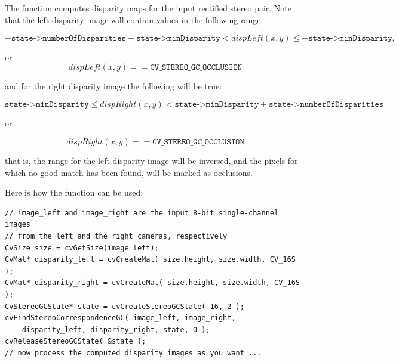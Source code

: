\begin{description}
\end{description}

The function computes disparity maps for the input rectified stereo pair. Note that the left disparity image will contain values in the following range: 

\[
-\texttt{state->numberOfDisparities}-\texttt{state->minDisparity}
< dispLeft(x,y) \le -\texttt{state->minDisparity},
\]

or
\[
dispLeft(x,y) == \texttt{CV\_STEREO\_GC\_OCCLUSION}
\]

and for the right disparity image the following will be true: 

\[
\texttt{state->minDisparity} \le dispRight(x,y) 
< \texttt{state->minDisparity} + \texttt{state->numberOfDisparities}
\]

or

\[
dispRight(x,y) == \texttt{CV\_STEREO\_GC\_OCCLUSION}
\]

that is, the range for the left disparity image will be inversed,
and the pixels for which no good match has been found, will be marked
as occlusions.

Here is how the function can be used:

\ifC
\begin{lstlisting}
// image_left and image_right are the input 8-bit single-channel images
// from the left and the right cameras, respectively
CvSize size = cvGetSize(image_left);
CvMat* disparity_left = cvCreateMat( size.height, size.width, CV_16S );
CvMat* disparity_right = cvCreateMat( size.height, size.width, CV_16S );
CvStereoGCState* state = cvCreateStereoGCState( 16, 2 );
cvFindStereoCorrespondenceGC( image_left, image_right,
    disparity_left, disparity_right, state, 0 );
cvReleaseStereoGCState( &state );
// now process the computed disparity images as you want ...
\end{lstlisting}

